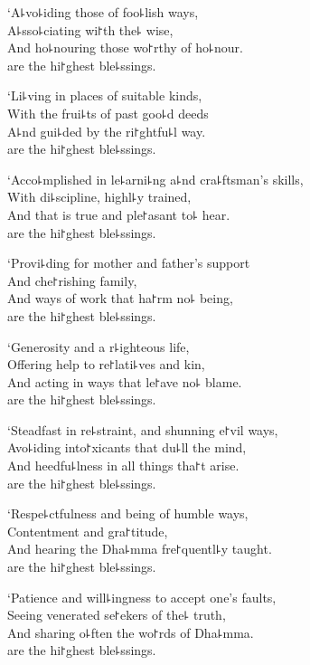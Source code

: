 `A꜕vo꜕iding those of foo꜕lish ways,\\
A꜕sso꜕ciating wi꜓th the꜕ wise,\\
And ho꜕nouring those wo꜓rthy of ho꜕nour.\\
 are the hi꜓ghest ble꜕ssings.

`Li꜕ving in places of suitable kinds,\\
With the frui꜕ts of past goo꜕d deeds\\
A꜕nd gui꜕ded by the ri꜓ghtfu꜕l way.\\
 are the hi꜓ghest ble꜕ssings.

\clearpage

`Acco꜕mplished in le꜕arni꜕ng a꜕nd cra꜕ftsman's skills,\\%
With di꜕scipline, highl꜕y trained,\\
And  that is true and ple꜓asant to꜕ hear.\\
 are the hi꜓ghest ble꜕ssings.

`Provi꜕ding for mother and father's support\\
And che꜓rishing family,\\
And ways of work that ha꜓rm no꜕ being,\\
 are the hi꜓ghest ble꜕ssings.

`Generosity and a r꜕ighteous life,\\
Offering help to re꜓lati꜕ves and kin,\\
And acting in ways that le꜓ave no꜕ blame.\\
 are the hi꜓ghest ble꜕ssings.

`Steadfast in re꜕straint, and shunning e꜓vil ways,\\
Avo꜕iding into꜓xicants that du꜕ll the mind,\\
And heedfu꜕lness in all things tha꜓t arise.\\
 are the hi꜓ghest ble꜕ssings.

`Respe꜕ctfulness and being of humble ways,\\
Contentment and gra꜓titude,\\
And hearing the Dha꜕mma fre꜓quentl꜕y taught.\\
 are the hi꜓ghest ble꜕ssings.

`Patience and will꜕ingness to accept one's faults,\\
Seeing venerated se꜓ekers of the꜕ truth,\\
And sharing o꜕ften the wo꜓rds of Dha꜕mma.\\
 are the hi꜓ghest ble꜕ssings.

